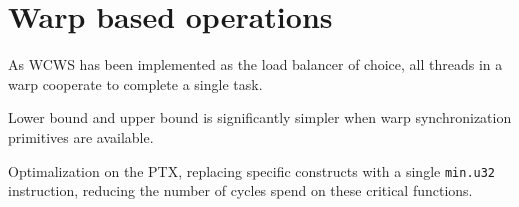 \section{Warp based operations}

As WCWS has been implemented as the load balancer of choice, all threads in a warp cooperate to complete a single task.

Lower bound and upper bound is significantly simpler when warp synchronization primitives are available.

Optimalization on the PTX, replacing specific constructs with a single \texttt{min.u32} instruction, reducing the number of cycles spend on these critical functions.
